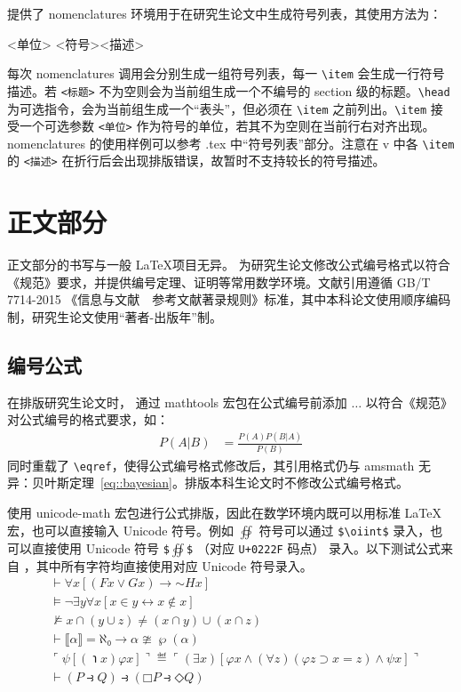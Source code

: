\documentclass[doctor]{shtthesis}
\begin{document}
\shtthesis{} 提供了 nomenclatures 环境用于在研究生论文中生成符号列表，其使用方法为：
\begin{latex}
\begin{nomenclatures}[<标题>]
  \item[<单位>]{<符号>}{<描述>}
\end{nomenclatures}
\end{latex}
每次 nomenclatures 调用会分别生成一组符号列表，每一 \verb|\item| 会生成一行符号描述。若 \verb|<标题>| 不为空则会为当前组生成一个不编号的 section 级的标题。\verb|\head| 为可选指令，会为当前组生成一个“表头”，但必须在 \verb|\item| 之前列出。\verb|\item| 接受一个可选参数 \verb|<单位>| 作为符号的单位，若其不为空则在当前行右对齐出现。nomenclatures 的使用样例可以参考 \jobname.tex 中“符号列表”部分。注意在 \shtthesis{} v\version{} 中各 \verb|\item| 的 \verb|<描述>| 在折行后会出现排版错误，故暂时不支持较长的符号描述。

\section{正文部分}
\shtthesis{} 正文部分的书写与一般 \LaTeX 项目无异。\shtthesis{} 为研究生论文修改公式编号格式以符合《规范》要求，并提供编号定理、证明等常用数学环境。文献引用遵循 GB/T 7714-2015 《信息与文献　参考文献著录规则》标准，其中本科论文使用顺序编码制，研究生论文使用“著者-出版年”制。

\subsection{编号公式}
在排版研究生论文时，\shtthesis{} 通过 \textsf{mathtools} 宏包在公式编号前添加 $\ldots$ 以符合《规范》对公式编号的格式要求，如：
\begin{align}
P(A|B) &= \frac{P(A)P(B|A)}{P(B)} \label{eq::bayesian}
\end{align}
同时重载了 \verb|\eqref|，使得公式编号格式修改后，其引用格式仍与 \textsf{amsmath} 无异：贝叶斯定理~\eqref{eq::bayesian}。排版本科生论文时不修改公式编号格式。

\shtthesis{} 使用 \textsf{unicode-math} 宏包进行公式排版，因此在数学环境内既可以用标准 \LaTeX{} 宏，也可以直接输入 Unicode 符号。例如 $\oiint$ 符号可以通过 \verb|$\oiint$| 录入，也可以直接使用 Unicode 符号 \verb|$|$∯$\verb|$| （对应 \verb|U+0222F| 码点） 录入。以下测试公式来自 \citet{clerkma2013unicode}，其中所有字符均直接使用对应 Unicode 符号录入。
\begin{align}
& ⊢ ∀x[(Fx ∨ Gx) → \mathord{∼}Hx] \\
& ⊨ ¬∃y∀x[x∈y ↔ x∉x]  \\
& ⊭ x ∩ (y ∪ z) ≠ (x ∩ y) ∪ (x ∩ z) \\
& ⊢ ⟦α⟧ = ℵ₀ → α ≇ ℘(α) \\
& ⌜ψ[(℩x)φx]⌝ ≝ ⌜(∃x)[φx ∧ (∀z)(φz ⊃ x=z) ∧ ψx]⌝ \\
& ⊢ (P ⥽ Q) ⥽ (□P ⥽ ◇Q)
\end{align}
\end{document}
